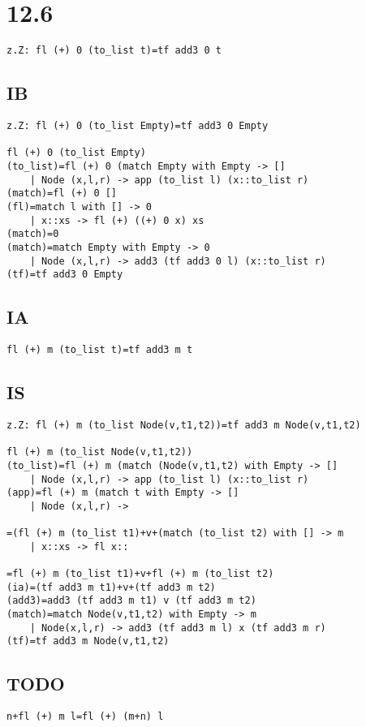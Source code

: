 \documentclass{article}
\begin{document}
\section*{12.6}

\begin{lstlisting}
z.Z: fl (+) 0 (to_list t)=tf add3 0 t
\end{lstlisting}

\subsection*{IB}

\begin{lstlisting}
z.Z: fl (+) 0 (to_list Empty)=tf add3 0 Empty

fl (+) 0 (to_list Empty)
(to_list)=fl (+) 0 (match Empty with Empty -> []
	| Node (x,l,r) -> app (to_list l) (x::to_list r)
(match)=fl (+) 0 []
(fl)=match l with [] -> 0
	| x::xs -> fl (+) ((+) 0 x) xs
(match)=0
(match)=match Empty with Empty -> 0
	| Node (x,l,r) -> add3 (tf add3 0 l) (x::to_list r)
(tf)=tf add3 0 Empty
\end{lstlisting}

\subsection*{IA}

\begin{lstlisting}
fl (+) m (to_list t)=tf add3 m t
\end{lstlisting}

\subsection*{IS}

\begin{lstlisting}
z.Z: fl (+) m (to_list Node(v,t1,t2))=tf add3 m Node(v,t1,t2)

fl (+) m (to_list Node(v,t1,t2))
(to_list)=fl (+) m (match (Node(v,t1,t2) with Empty -> []
	| Node (x,l,r) -> app (to_list l) (x::to_list r)
(app)=fl (+) m (match t with Empty -> [] 
	| Node (x,l,r) ->

=(fl (+) m (to_list t1)+v+(match (to_list t2) with [] -> m
	| x::xs -> fl x::

=fl (+) m (to_list t1)+v+fl (+) m (to_list t2)
(ia)=(tf add3 m t1)+v+(tf add3 m t2)
(add3)=add3 (tf add3 m t1) v (tf add3 m t2)
(match)=match Node(v,t1,t2) with Empty -> m
	| Node(x,l,r) -> add3 (tf add3 m l) x (tf add3 m r)
(tf)=tf add3 m Node(v,t1,t2)
\end{lstlisting}

\subsection*{TODO}

\begin{lstlisting}
n+fl (+) m l=fl (+) (m+n) l
\end{lstlisting}
\end{document}
